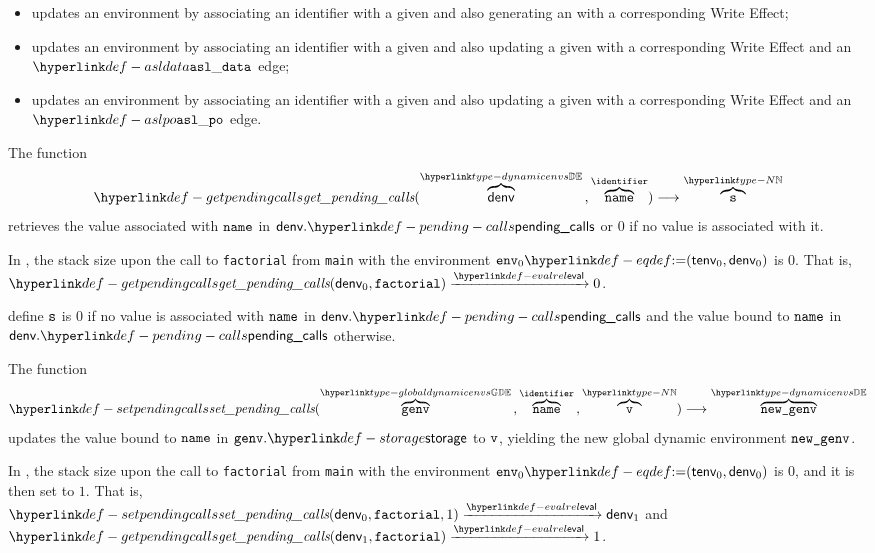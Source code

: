 \begin{itemize}
  \item {} updates an environment by associating an identifier with a given \nativevalueterm{}
        and also generating an \executiongraph{} with a corresponding Write Effect;
  \item {} updates an environment by associating an identifier with a given \nativevalueterm{}
        and also updating a given \executiongraph{} with a corresponding Write Effect and an $\asldata$ edge;
  \item {} updates an environment by associating an identifier with a given \nativevalueterm{}
        and also updating a given \executiongraph{} with a corresponding Write Effect and an $\aslpo$ edge.
\end{itemize}

\hypertarget{def-getpendingcalls}{}
The function
\[
\getpendingcalls(\overname{\denv}{\dynamicenvs} \aslsep \overname{\name}{\identifier}) \aslto \overname{\vs}{\N}
\]
retrieves the value associated with $\name$ in $\denv.\pendingcalls$ or $0$ if no value is associated with it.

In , the stack size upon the call to \verb|factorial| from \verb|main|
with the environment $\env_0 \eqdef (\tenv_0, \denv_0)$ is $0$.
That is, $\getpendingcalls(\denv_0, \factorial) \evalarrow 0$.

\ProseParagraph
define $\vs$ is $0$ if no value is associated with $\name$ in $\denv.\pendingcalls$ and the value bound to
$\name$ in $\denv.\pendingcalls$ otherwise.

\FormallyParagraph
\begin{mathpar}
\end{mathpar}

\hypertarget{def-setpendingcalls}{}
The function
\[
\setpendingcalls(\overname{\genv}{\globaldynamicenvs} \aslsep \overname{\name}{\identifier} \aslsep \overname{\vv}{\N}) \aslto
\overname{\newgenv}{\dynamicenvs}
\]
updates the value bound to $\name$ in $\genv.\storage$ to $\vv$, yielding the new global dynamic environment $\newgenv$.

In , the stack size upon the call to \verb|factorial| from \verb|main|
with the environment $\env_0 \eqdef (\tenv_0, \denv_0)$ is $0$, and it is then set to $1$.
That is, \\
$\setpendingcalls(\denv_0, \factorial, 1) \evalarrow \denv_1$
and\\
$\getpendingcalls(\denv_1, \factorial) \evalarrow 1$.

